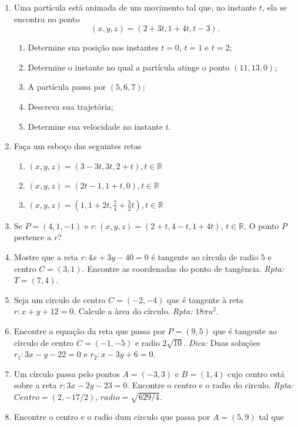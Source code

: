 \documentclass{article}
\theoremstyle{plain}
\theoremstyle{definition}
\theoremstyle{remark}
\begin{document}
  \begin{enumerate}
     \item Uma partícula está animada de um movimento 
     tal que, no instante $t$, ela se encontra no ponto
     $$(x,y,z)=(2+3t, 1+4t, t-3).$$
      \begin{enumerate}
      \item Determine sua posição nos instantes
      $t=0$, $t=1$ e $t=2$;
      \item Determine o instante no qual a partícula 
      atinge o ponto $(11, 13, 0)$;
      \item A partícula passa por $(5,6,7)$;
      \item Descreva sua trajetória;   
      \item Determine sua velocidade no instante $t$.
      \end{enumerate}
    \item Faça um esboço das seguintes retas
       \begin{enumerate}
       \item $(x,y,z)=(3-3t, 3t, 2+t), t \in \mathbb{R}$
       \item $(x,y,z)=(2t-1, 1+t, 0), t \in \mathbb{R}$
       \item $(x,y,z)=(1, 1+2t, \frac{7}{4}+\frac{3}{2}t), t \in \mathbb{R}$
       \end{enumerate}  
    \item Se $P=(4,1,-1)$ e 
    $r: (x,y,z)=(2+t,4-t, 1+4t)$, $t \in \mathbb{R}$.
    O ponto $P$ pertence a $r$?          
    \item Mostre que a reta $r: 4x+3y-40=0$
    é tangente ao círculo de radio $5$ e centro $C=(3,1)$. Encontre as coordenadas do ponto de tangência.
    {\it Rpta: } $T=(7,4)$.
    \item Seja um circulo de centro $C=(-2,-4)$ que é 
    tangente à reta $r: x+y+12=0$. Calcule a àrea do círculo. {\it Rpta: } $18\pi u^2$.
     \item Encontre a equação da reta que passa por 
    $P=(9,5)$ que é tangente ao círculo de centro 
    $C=(-1,-5)$ e radio $2\sqrt{10}$.
    {\it Dica:} Duas soluções $r_1: 3x-y-22=0$ e 
    $r_2: x-3y+6=0$.
    \item Um círculo passa pelo pontos $A=(-3,3)$
    e $B=(1,4)$ cujo centro está sobre a reta
    $r: 3x-2y-23=0$. Encontre o centro e o radio do circulo.  
    {\it Rpta: } $Centro=(2,-17/2)$, $radio=\sqrt{629/4}$. 
    \item Encontre o centro e o radio dum circulo que passa por 
    $A=(5,9)$ tal que  

\end{enumerate}
\end{document}
